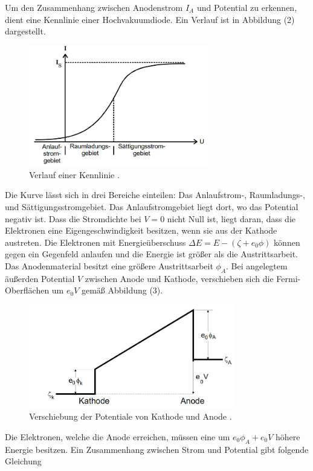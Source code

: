 Um den Zusammenhang zwischen Anodenstrom $I_A$ und Potential zu erkennen, dient eine Kennlinie einer Hochvakuumdiode. Ein Verlauf ist in Abbildung (2) dargestellt.
\begin{figure}[H]
  \centering
  \includegraphics[width=0.7\textwidth]{k.png}
  \caption{Verlauf einer Kennlinie \cite{kent}.}
  \label{fig:aufbau}
\end{figure}
Die Kurve lässt sich in drei Bereiche einteilen: Das Anlaufstrom-, Raumladungs-, und Sättigungsstromgebiet. Das Anlaufstromgebiet liegt dort, wo das Potential negativ ist.
Dass die Stromdichte bei $V=0$ nicht Null ist, liegt daran, dass die Elektronen eine Eigengeschwindigkeit besitzen, wenn sie aus der Kathode austreten. Die Elektronen mit Energieüberschuss $\Delta E = E - ( \zeta + e_0 \phi)$ können gegen ein Gegenfeld anlaufen und die Energie ist größer als die Austrittsarbeit.
Das Anodenmaterial besitzt eine größere Austrittsarbeit $\phi_A$. Bei angelegtem äußerden Potential $V$ zwischen Anode und Kathode, verschieben sich die Fermi-Oberflächen um $e_0V$ gemäß Abbildung (3).
\begin{figure}[H]
  \centering
  \includegraphics[width=0.8\textwidth]{blah.png}
  \caption{Verschiebung der Potentiale von Kathode und Anode \cite{kent}.}
  \label{fig:aufbau}
\end{figure}
Die Elektronen, welche die Anode erreichen, müssen eine um $e_0 \phi_A + e_0 V$ höhere Energie besitzen. Ein Zusammenhang zwischen Strom und Potential gibt folgende Gleichung
